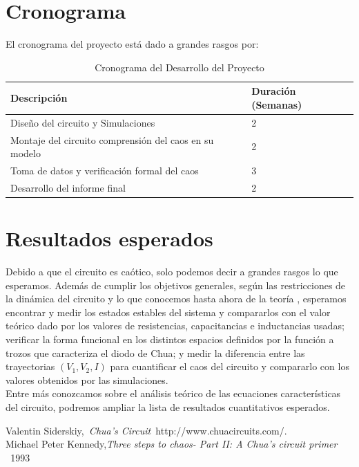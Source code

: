 \documentclass[%
 reprint,
%
 amsmath,amssymb,
 aps,
]{revtex4-1}
\begin{document}
\section{\label{sec:level1}Cronograma}
El cronograma del proyecto está dado a grandes rasgos por: 

\begin{table}[!hb]
\centering
 \begin{tabular}{|p{6cm}|p{2cm}|} 
 \hline
 Descripción & Duración (Semanas) \\ [0.5ex] 
 \hline\hline
 Diseño del circuito y Simulaciones & 2\\
  \hline
 Montaje del circuito comprensión del caos en su modelo & 2\\
  \hline
 Toma de datos y verificación formal del caos & 3\\
  \hline
 Desarrollo del informe final & 2 \\
[1ex] 
 \hline
 \end{tabular}
 \caption{Cronograma del Desarrollo del Proyecto}
\end{table}

\section{\label{sec:level1}Resultados esperados}
 Debido a que el circuito es caótico, solo podemos decir a grandes rasgos lo que esperamos. Además de cumplir los objetivos generales, según las restricciones de la dinámica del circuito y lo que conocemos hasta ahora de la teoría \cite{Paper}, esperamos encontrar y medir los estados estables del sistema y compararlos con el valor teórico dado por los valores de resistencias, capacitancias e inductancias usadas; verificar la forma funcional en los distintos espacios definidos por la función a trozos que caracteriza el diodo de Chua; y medir la diferencia entre las trayectorias $(V_1, V_2, I)$ para cuantificar el caos del circuito y compararlo con los valores obtenidos por las simulaciones.\\
 
Entre más conozcamos sobre el análisis teórico de las ecuaciones características del circuito, podremos ampliar la lista de resultados cuantitativos esperados.\\

\begin{thebibliography}{99} 
Valentin Siderskiy,{\it \ Chua's Circuit\ }{http://www.chuacircuits.com/}.\\ 
 Michael Peter Kennedy,{\it Three steps to chaos- Part II: A Chua's circuit primer \ }{1993}\\ \end{thebibliography}
\end{document}
